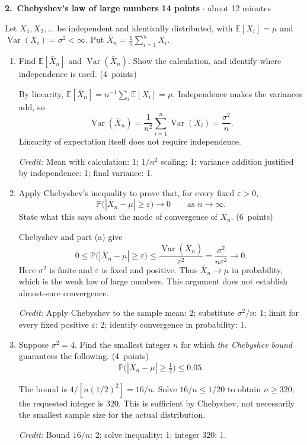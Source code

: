 \documentclass[11pt,letterpaper]{article}
\newcommand{\Prob}{\mathbb P}
\newcommand{\E}{\mathbb E}
\DeclareMathOperator{\Var}{Var}
\newcommand{\partpts}[1]{\unskip\nobreak\hspace{.3em}%
  \mbox{\small\color{muted}(#1 points)}}
\newcommand{\credit}[1]{\par{\footnotesize\color{muted}\textit{Credit:} #1}}
\newcommand{\problem}[4]{\par\addvspace{8pt}%
  {\large\bfseries\color{indigo}#1.\ #2}\hfill
  {\small\color{muted}\textbf{#3 points} $\cdot$ about #4 minutes}\par\nobreak}
\begin{document}
\newpage
\problem{2}{Chebyshev's law of large numbers}{14}{12}
Let $X_1,X_2,\ldots$ be independent and identically distributed, with
$\E[X_i]=\mu$ and $\Var(X_i)=\sigma^2<\infty$. Put
$\bar X_n=\frac1n\sum_{i=1}^n X_i$.
\begin{enumerate}
  \item Find $\E[\bar X_n]$ and $\Var(\bar X_n)$.
  Show the calculation, and identify where independence is used.
  \partpts{4}
  \begin{solution}[1.4in]
    By linearity,
    $\E[\bar X_n]=n^{-1}\sum_i\E[X_i]=\mu$.
    Independence makes the variances add, so
    \[
      \Var(\bar X_n)=\frac1{n^2}\sum_{i=1}^n\Var(X_i)
                   =\frac{\sigma^2}{n}.
    \]
    Linearity of expectation itself does not require independence.
    \credit{Mean with calculation: 1; $1/n^2$ scaling: 1;
    variance addition justified by independence: 1; final variance: 1.}
  \end{solution}

  \item Apply Chebyshev's inequality to prove that, for every fixed
  $\varepsilon>0$,
  \[
    \Prob\bigl(|\bar X_n-\mu|\ge\varepsilon\bigr)\longrightarrow0
       \qquad\text{as }n\longrightarrow\infty.
  \]
  State what this says about the mode of convergence of $\bar X_n$.
  \partpts{6}
  \begin{solution}[2.05in]
    Chebyshev and part (a) give
    \[
      0\le\Prob\bigl(|\bar X_n-\mu|\ge\varepsilon\bigr)
         \le\frac{\Var(\bar X_n)}{\varepsilon^2}
         =\frac{\sigma^2}{n\varepsilon^2}\longrightarrow0.
    \]
    Here $\sigma^2$ is finite and $\varepsilon$ is fixed and positive.
    Thus $\bar X_n\to\mu$ in probability, which is the weak law of
    large numbers. This argument does not establish almost-sure convergence.
    \credit{Apply Chebyshev to the sample mean: 2; substitute
    $\sigma^2/n$: 1; limit for every fixed positive $\varepsilon$: 2;
    identify convergence in probability: 1.}
  \end{solution}

  \item Suppose $\sigma^2=4$. Find the smallest integer $n$ for which
  \emph{the Chebyshev bound} guarantees the following. \partpts{4}
  \[
    \Prob\bigl(|\bar X_n-\mu|\ge\tfrac12\bigr)\le0.05.
  \]
  \begin{solution}[1.25in]
    The bound is $4/[n(1/2)^2]=16/n$. Solve
    $16/n\le1/20$ to obtain $n\ge320$; the requested integer is $320$.
    This is sufficient by Chebyshev, not necessarily the smallest sample
    size for the actual distribution.
    \credit{Bound $16/n$: 2; solve inequality: 1; integer $320$: 1.}
  \end{solution}
\end{enumerate}
\end{document}
